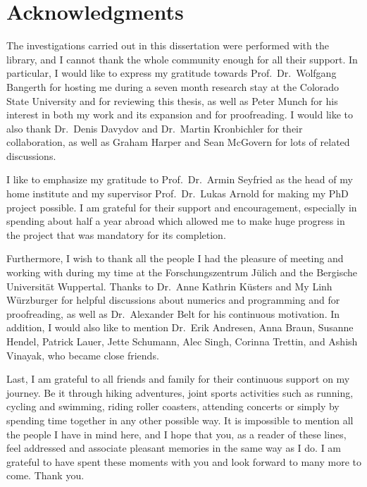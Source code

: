 \section*{\centering Acknowledgments}

The investigations carried out in this dissertation were performed with the \dealii{} library, and I cannot thank the whole \dealii{} community enough for all their support. In particular, I would like to express my gratitude towards Prof.\ Dr.\ Wolfgang Bangerth for hosting me during a seven month research stay at the Colorado State University and for reviewing this thesis, as well as Peter Munch for his interest in both my work and its expansion and for proofreading. I would like to also thank Dr.\ Denis Davydov and Dr.\ Martin Kronbichler for their collaboration, as well as Graham Harper and Sean McGovern for lots of \dealii{} related discussions.

I like to emphasize my gratitude to Prof.\ Dr.\ Armin Seyfried as the head of my home institute and my supervisor Prof.\ Dr.\ Lukas Arnold for making my PhD project possible. I am grateful for their support and encouragement, especially in spending about half a year abroad which allowed me to make huge progress in the project that was mandatory for its completion.

Furthermore, I wish to thank all the people I had the pleasure of meeting and working with during my time at the Forschungszentrum Jülich and the Bergische Universität Wuppertal. Thanks to Dr.\ Anne Kathrin Küsters and My Linh Würzburger for helpful discussions about numerics and programming and for proofreading, as well as Dr.\ Alexander Belt for his continuous motivation. In addition, I would also like to mention Dr.\ Erik Andresen, Anna Braun, Susanne Hendel, Patrick Lauer, Jette Schumann, Alec Singh, Corinna Trettin, and Ashish Vinayak, who became close friends.

Last, I am grateful to all friends and family for their continuous support on my journey. Be it through hiking adventures, joint sports activities such as running, cycling and swimming, riding roller coasters, attending concerts or simply by spending time together in any other possible way. It is impossible to mention all the people I have in mind here, and I hope that you, as a reader of these lines, feel addressed and associate pleasant memories in the same way as I do. I am grateful to have spent these moments with you and look forward to many more to come. Thank you.
